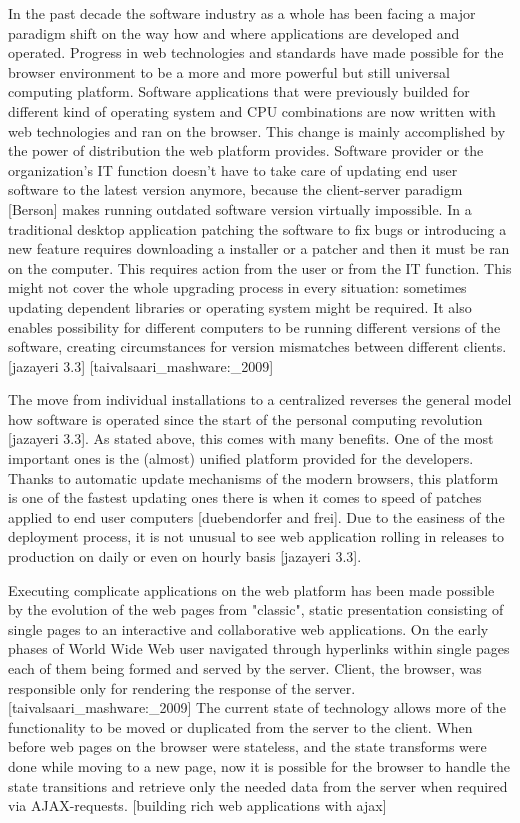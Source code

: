In the past decade the software industry as a whole has been facing a major paradigm shift on the way how and where applications are developed and operated. Progress in web technologies and standards have made possible for the browser environment to be a more and more powerful but still universal computing platform. Software applications that were previously builded for different kind of operating system and CPU combinations are now written with web technologies and ran on the browser. This change is mainly accomplished by the power of distribution the web platform provides. Software provider or the organization's IT function doesn't have to take care of updating end user software to the latest version anymore, because the client-server paradigm [Berson] makes running outdated software version virtually impossible. In a traditional desktop application patching the software to fix bugs or introducing a new feature requires downloading a installer or a patcher and then it must be ran on the computer. This requires action from the user or from the IT function. This might not cover the whole upgrading process in every situation: sometimes updating dependent libraries or operating system might be required. It also enables possibility for different computers to be running different versions of the software, creating circumstances for version mismatches between different clients. [jazayeri 3.3] [taivalsaari_mashware:_2009]

The move from individual installations to a centralized reverses the general model how software is operated since the start of the personal computing revolution [jazayeri 3.3]. As stated above, this comes with many benefits. One of the most important ones is the (almost) unified platform provided for the developers. Thanks to automatic update mechanisms of the modern browsers, this platform is one of the fastest updating ones there is when it comes to speed of patches applied to end user computers [duebendorfer and frei]. Due to the easiness of the deployment process, it is not unusual to see web application rolling in releases to production on daily or even on hourly basis [jazayeri 3.3].

Executing complicate applications on the web platform has been made possible by the evolution of the web pages from "classic", static presentation consisting of single pages to an interactive and collaborative web applications. On the early phases of World Wide Web user navigated through hyperlinks within single pages each of them being formed and served by the server. Client, the browser, was responsible only for rendering the response of the server. [taivalsaari_mashware:_2009] The current state of technology allows more of the functionality to be moved or duplicated from the server to the client. When before web pages on the browser were stateless, and the state transforms were done while moving to a new page, now it is possible for the browser to handle the state transitions and retrieve only the needed data from the server when required via AJAX-requests. [building rich web applications with ajax] 




